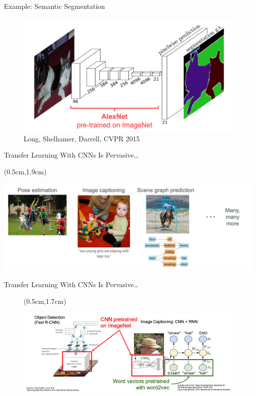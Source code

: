 \documentclass[serif, aspectratio=169]{beamer}
\begin{document}
\begin{frame}{Example: Semantic Segmentation}
	\begin{figure}[htpb]
		\begin{center}
			\includegraphics[keepaspectratio, scale=0.25]{pic/sem}
			\caption*{\scriptsize Long, Shelhamer, Darrell, CVPR 2015}
		\end{center}
	\end{figure}
\end{frame}

\begin{frame}{Transfer Learning With CNNs Is Pervasive…}
	\begin{textblock*}{5cm}(0.5cm,1.9cm) %
		\begin{center}
			\includegraphics[keepaspectratio, scale=0.31]{pic/TL_examples}
		\end{center}
	\end{textblock*}
\end{frame}

\begin{frame}{Transfer Learning With CNNs Is Pervasive…}
	\begin{figure}[htpb]
		\begin{textblock*}{2cm}(0.5cm,1.7cm) %
			\begin{center}
				\includegraphics[keepaspectratio, scale=0.29]{pic/TL_examples2}
			\end{center}
		\end{textblock*}
	\end{figure}
\end{frame}
\end{document}
